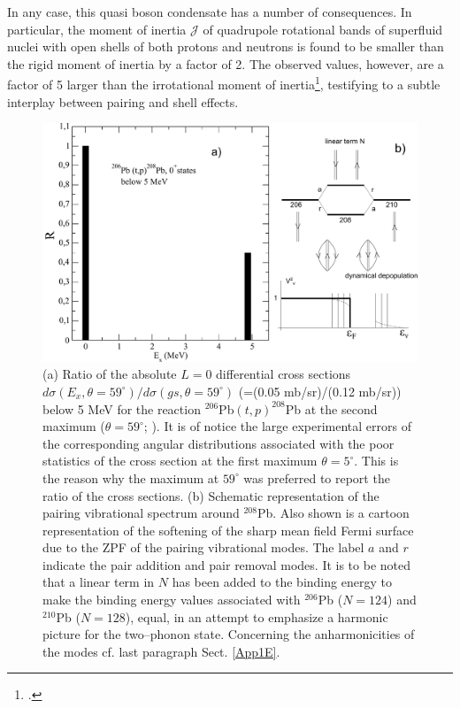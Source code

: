 In any case, this quasi boson condensate has a number of consequences. In particular, the moment of inertia $\mathcal J$ of quadrupole rotational bands of superfluid nuclei with open shells of both protons and neutrons is found to be smaller than the rigid moment of inertia by a factor of 2. The observed values, however, are a factor of 5 larger than the irrotational moment of inertia\footnote{\cite{Bohr:75,Belyaev:59,Belyaev:13}.}, testifying to a subtle interplay between pairing and shell effects.
\begin{figure}
\centerline{\includegraphics*[width=\textwidth,angle=0]{nutshell/figs/Excited0Pb206tp.pdf}}
\caption{(a) Ratio of the absolute $L=0$ differential cross sections $d\sigma(E_x,\theta=59^{\circ})/d\sigma(gs,\theta=59^{\circ})$ (=(0.05 mb/sr)/(0.12 mb/sr)) below 5 MeV  for the reaction $^{206}$Pb$(t,p)^{208}$Pb at the second maximum ($\theta=59^{\circ}$; \cite{Bjerregaard:66b}). It is of notice the large experimental errors of the corresponding angular distributions associated with the poor statistics of the cross section at the first maximum $\theta=5^{\circ}$. This is the reason why the maximum at $59^\circ$ was preferred to report the ratio of the cross sections. (b) Schematic representation of the pairing vibrational spectrum around $^{208}$Pb. Also shown is a cartoon representation of the softening of the sharp mean field Fermi surface due to the ZPF of the pairing vibrational modes. The label $a$ and $r$ indicate the pair addition and pair removal modes. It is to be noted that a linear term in $N$ has been added to the binding energy to make the binding energy values associated with $^{206}$Pb ($N=124$) and $^{210}$Pb ($N=128$), equal, in an attempt to emphasize a harmonic picture for the two--phonon state. Concerning the anharmonicities of the modes cf. last paragraph Sect. \ref{App1E}.}\label{fig1.1}
\end{figure}



